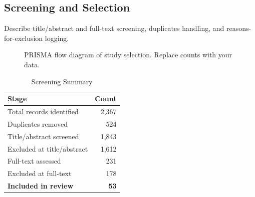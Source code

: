 \documentclass[11pt]{article}
\begin{document}
\subsection{Screening and Selection}
Describe title/abstract and full-text screening, duplicates handling, and reasons-for-exclusion logging.

\begin{figure}[ht]
  \centering
  \caption{PRISMA flow diagram of study selection. Replace counts with your data.}
  \label{fig:prisma}
\end{figure}

\begin{table}[ht]
  \centering
  \caption{Screening Summary}
  \label{tab:screening}
  \begin{tabular}{lr}
    \toprule
    Stage & Count \\
    \midrule
    Total records identified    & 2,367 \\
    Duplicates removed          & 524 \\
    Title/abstract screened     & 1,843 \\
    Excluded at title/abstract  & 1,612 \\
    Full-text assessed          & 231 \\
    Excluded at full-text       & 178 \\
    \textbf{Included in review} & \textbf{53} \\
    \bottomrule
  \end{tabular}
\end{table}
\end{document}
